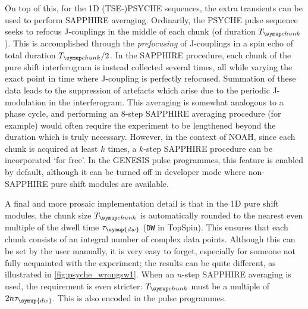 On top of this, for the 1D (TSE-)PSYCHE sequences, the extra transients can be used to perform SAPPHIRE averaging\autocite{Moutzouri2017CC}.
Ordinarily, the PSYCHE pulse sequence seeks to refocus J-couplings in the middle of each chunk (of duration $\Tchunk$).
This is accomplished through the \textit{prefocusing} of J-couplings in a spin echo of total duration $\Tchunk/2$.\autocite{Aguilar2010ACIE}
In the SAPPHIRE procedure, each chunk of the pure shift interferogram is instead collected several times, all while varying the exact point in time where J-coupling is perfectly refocused.
Summation of these data leads to the suppression of artefacts which arise due to the periodic J-modulation in the interferogram.
This averaging is somewhat analogous to a phase cycle, and performing an 8-step SAPPHIRE averaging procedure (for example) would often require the experiment to be lengthened beyond the duration which is truly necessary.
However, in the context of NOAH, since each chunk is acquired at least $k$ times, a $k$-step SAPPHIRE procedure can be incorporated `for free'.
In the GENESIS pulse programmes, this feature is enabled by default, although it can be turned off in developer mode where non-SAPPHIRE pure shift modules are available.

A final and more prosaic implementation detail is that in the 1D pure shift modules, the chunk size $\Tchunk$ is automatically rounded to the nearest even multiple of the dwell time $\tau_{\symup{dw}}$ (\texttt{DW} in TopSpin).
This ensures that each chunk consists of an integral number of complex data points.
Although this can be set by the user manually, it is very easy to forget, especially for someone not fully acquainted with the experiment; the results can be quite different, as illustrated in \cref{fig:psyche_wrongsw1}.
When an $n$-step SAPPHIRE averaging is used, the requirement is even stricter: $\Tchunk$ must be a multiple of $2n \tau_{\symup{dw}}$.
This is also encoded in the pulse programmes.

